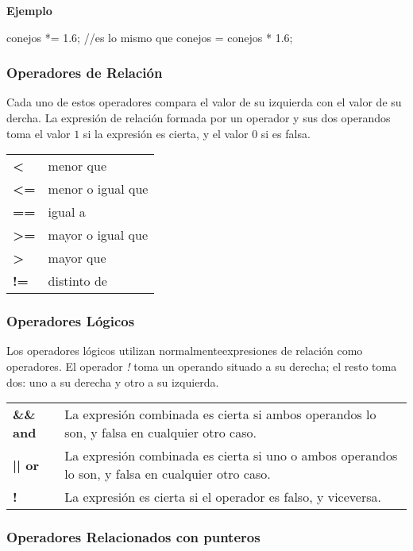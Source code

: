 \textbf{Ejemplo}

conejos *= 1.6; //es lo mismo que conejos = conejos * 1.6;

\subsubsection{Operadores de Relación}

Cada uno de estos operadores compara el valor de su izquierda con el valor de su dercha. La expresión de relación formada por un operador y sus dos operandos toma el valor $1$ si la expresión es cierta, y el valor $0$ si es falsa.

\begin{tabular}{p{0.5cm}p{14cm}}
\textbf{<} & menor que\\
\textbf{<=} & menor o igual que\\
\textbf{==} & igual a\\
\textbf{>=} & mayor o igual que\\
\textbf{>} & mayor que\\
\textbf{!=} & distinto de\\
\end{tabular}

\subsubsection{Operadores Lógicos}

Los operadores lógicos utilizan normalmenteexpresiones de relación como operadores. El operador \textit{!} toma un operando situado a su derecha; el resto toma dos: uno a su derecha y otro a su izquierda.

\begin{tabular}{p{1.5cm}p{13cm}}
\textbf{\&\& and} & La expresión combinada es cierta si ambos operandos lo son, y falsa en cualquier otro caso.\\
\textbf{|| or} & La expresión combinada es cierta si uno o ambos operandos lo son, y falsa en cualquier otro caso.\\
\textbf{!} & La expresión es cierta si el operador es falso, y viceversa.\\
\end{tabular}

\subsubsection{Operadores Relacionados con punteros}

